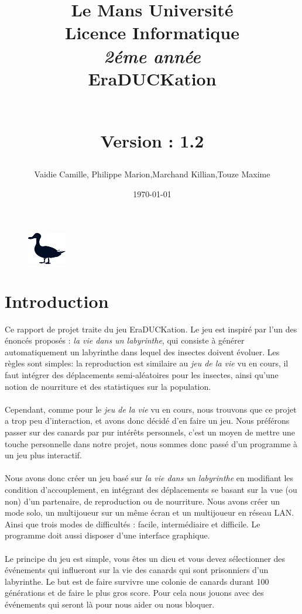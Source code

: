 \documentclass[12pt,a4paper,twoside]{article}
\begin{document}
\title {\textbf {\color {blue} Le Mans Université}\color{black}
\\Licence Informatique  
\\ \textit {2éme année}
\\ \textbf {\color {red}EraDUCKation}
\author{Vaidie Camille, Philippe Marion,Marchand Killian,Touze Maxime}
\\ Version : 1.2 
\date \today }
\maketitle 
\begin {figure}
\begin{center}\includegraphics[width=0.15\textwidth]{IMG/images.png} \end{center}
\hspace{100pt}
\end {figure}
\newpage
\tableofcontents
\newpage
\section{Introduction}
    Ce rapport de projet traite du jeu EraDUCKation. Le jeu est inspiré par l'un des énoncés proposés :
 \textit{la vie dans un labyrinthe}, qui consiste à générer automatiquement
 un labyrinthe dans lequel des insectes doivent évoluer. Les règles sont 
simples: la reproduction est similaire au \textit{jeu de la vie} vu en cours, il faut intégrer des déplacements semi-aléatoires pour 
les insectes, ainsi qu'une notion de nourriture et des statistiques sur 
la population.
\\
\\Cependant, comme pour le \textit{jeu de la vie} vu en cours, nous
trouvons que ce projet a trop peu d'interaction, et avons donc décidé 
d'en faire un jeu. Nous préférons passer sur des canards par pur intérêts 
personnels, c'est un moyen de mettre une touche personnelle dans notre projet, 
nous sommes donc passé d’un programme à un jeu plus interactif.
\\
\\Nous avons donc créer un jeu basé sur \textit{la vie dans un labyrinthe} en modifiant les condition d'accouplement, en intégrant des déplacements se basant sur la vue (ou non) d'un partenaire, de reproduction ou de nourriture. Nous avons créer un mode solo, un multijoueur sur un même écran et un multijoueur en réseau LAN. Ainsi que trois modes de difficultés : 
facile, intermédiaire et difficile. Le programme doit aussi disposer d'une interface graphique. \\
\\Le principe du jeu est simple, vous êtes un dieu et vous devez sélectionner des événements qui influeront sur la vie des canards qui sont prisonniers d’un labyrinthe. Le but est de faire survivre une colonie de canards durant 100 générations et de faire le plus gros score. Pour cela nous jouons avec des événements qui seront là pour nous aider ou nous bloquer.\\
\newpage
\end{document}
